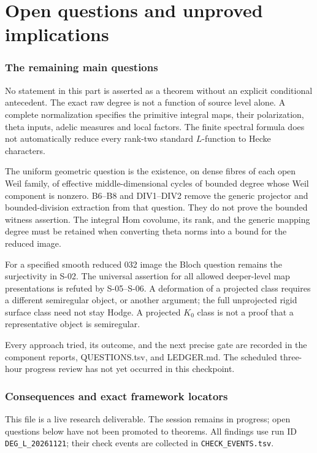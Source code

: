 \documentclass[11pt,a4paper]{article}
\theoremstyle{definition}
\begin{document}
\clearpage
\part{Open questions and unproved implications}
\section{The remaining main questions}
No statement in this part is asserted as a theorem without an explicit
conditional antecedent. The exact raw degree is not a function of source
level alone. A complete normalization specifies the primitive integral
maps, their polarization, theta inputs, adelic measures and local factors.
The finite spectral formula does not automatically reduce every rank-two
standard $L$-function to Hecke characters.

The uniform geometric question is the existence, on dense fibres of each
open Weil family, of effective middle-dimensional cycles of bounded degree
whose Weil component is nonzero. B6--B8 and DIV1--DIV2 remove the generic
projector and bounded-division extraction from that question. They do not
prove the bounded witness assertion. The integral Hom covolume, its rank,
and the generic mapping degree must be retained when converting theta
norms into a bound for the reduced image.

For a specified smooth reduced 032 image the Bloch question remains the
surjectivity in S-02. The universal assertion for all allowed deeper-level
map presentations is refuted by S-05--S-06. A deformation of a projected
class requires a different semiregular object, or another argument; the
full unprojected rigid surface class need not stay Hodge. A projected
$K_0$ class is not a proof that a representative object is semiregular.

Every approach tried, its outcome, and the next precise gate are recorded
in the component reports, QUESTIONS.tsv, and LEDGER.md. The scheduled
three-hour progress review has not yet occurred in this checkpoint.
\section{Consequences and exact framework locators}

This file is a live research deliverable. The session remains in
progress; open questions below have not been promoted to theorems. All
findings use run ID \texttt{DEG\_L\_20261121}; their check events are
collected in \texttt{CHECK\_EVENTS.tsv}.
\end{document}
